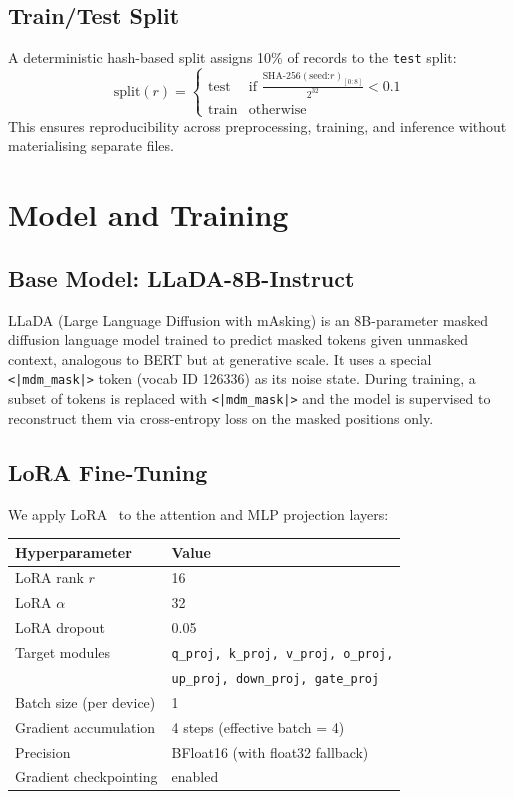 \documentclass[11pt,a4paper]{article}
\begin{document}
\subsection{Train/Test Split}

A deterministic hash-based split assigns 10\% of records to the \texttt{test} split:
\[
  \text{split}(r) = \begin{cases} \text{test} & \text{if } \frac{\text{SHA-256}(\text{seed:}r)_{[0:8]}}{2^{32}} < 0.1 \\ \text{train} & \text{otherwise} \end{cases}
\]
This ensures reproducibility across preprocessing, training, and inference without materialising separate files.

\section{Model and Training}
\label{sec:model}

\subsection{Base Model: LLaDA-8B-Instruct}

LLaDA (Large Language Diffusion with mAsking) is an 8B-parameter masked diffusion language model trained to predict masked tokens given unmasked context, analogous to BERT but at generative scale. It uses a special \texttt{<|mdm\_mask|>} token (vocab ID 126336) as its noise state. During training, a subset of tokens is replaced with \texttt{<|mdm\_mask|>} and the model is supervised to reconstruct them via cross-entropy loss on the masked positions only.

\subsection{LoRA Fine-Tuning}

We apply LoRA~\cite{lora} to the attention and MLP projection layers:

\begin{center}
\begin{tabular}{ll}
\toprule
\textbf{Hyperparameter} & \textbf{Value}\\
\midrule
LoRA rank $r$ & 16\\
LoRA $\alpha$ & 32\\
LoRA dropout & 0.05\\
Target modules & \texttt{q\_proj, k\_proj, v\_proj, o\_proj,}\\
               & \texttt{up\_proj, down\_proj, gate\_proj}\\
Batch size (per device) & 1\\
Gradient accumulation & 4 steps (effective batch = 4)\\
Precision & BFloat16 (with float32 fallback)\\
Gradient checkpointing & enabled\\
\bottomrule
\end{tabular}
\end{center}
\end{document}
